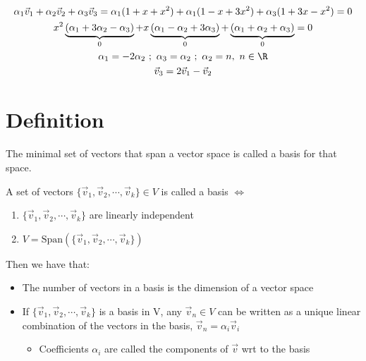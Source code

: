 \documentclass[a4paper, 11pt, normalem]{report}
\begin{document}
\begin{enumerate}
\begin{gather*}
                \alpha_{1}\vec{v}_{1} + \alpha_{2}\vec{v}_{2} + \alpha_{3}\vec{v}_{3} = \alpha_{1}(1 + x + x^2) + \alpha_{1}(1 - x + 3x^2) + \alpha_{3}(1 + 3x - x^2) = 0 \\
                x^{2}\underbrace{(\alpha_{1} + 3\alpha_2 - \alpha_3)}_{0} + x\underbrace{(\alpha_1 - \alpha_2 + 3\alpha_3)}_{0} + \underbrace{(\alpha_1 + \alpha_2 + \alpha_3)}_{0} = 0 \\
                \alpha_1 = -2\alpha_2 ~;~ \alpha_3 = \alpha_2 ~;~ \alpha_2 = n,~n \in \R \\
                \vec{v}_3 = 2\vec{v}_1 - \vec{v}_2
            \end{gather*}
\end{enumerate}

\section{Definition}
The minimal set of vectors that span a vector space is called a basis for that space.

A set of vectors $\{\vec{v}_{1},\vec{v}_{2},\cdots,\vec{v}_{k}\} \in V$ is called a basis $\iff$
\begin{enumerate}
    \item $\{\vec{v}_{1},\vec{v}_{2},\cdots,\vec{v}_{k}\}$ are linearly independent
    \item $V = \text{Span}(\{\vec{v}_{1},\vec{v}_{2},\cdots,\vec{v}_{k}\})$
\end{enumerate}

Then we have that:
\begin{itemize}
    \item The number of vectors in a basis is the dimension of a vector space
    \item If $\{\vec{v}_{1},\vec{v}_{2},\cdots,\vec{v}_{k}\}$ is a basis in V, any $\vec{v}_n \in V$ can be written as a unique linear combination of the vectors in the basis, $\vec{v}_n = \alpha_i \vec{v}_i$
        \begin{itemize}
            \item Coefficients $\alpha_i$ are called the components of $\vec{v}$ wrt to the basis
        \end{itemize}
\end{itemize}
\end{document}
